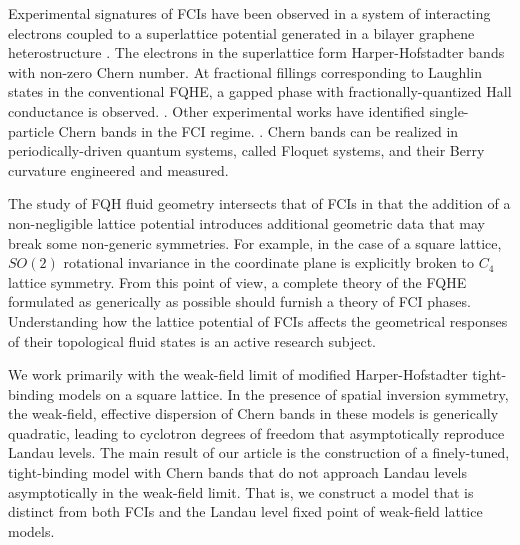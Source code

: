 \documentclass[aps,prb,twocolumn,letterpaper,twoside,nobalancelastpage,groupedaddress,amsmath,amssymb,floatfix,citeautoscript]{revtex4-1}
\begin{document}
 Experimental signatures of FCIs have been observed in a system of interacting electrons coupled to a superlattice potential generated in a bilayer graphene heterostructure \cite{Spantoneaan8458}. The electrons in the superlattice form Harper-Hofstadter bands with non-zero Chern number. At fractional fillings corresponding to Laughlin states in the conventional FQHE, a gapped phase with fractionally-quantized Hall conductance is observed. \cite{Spantoneaan8458}. Other experimental works have identified single-particle Chern bands in the FCI regime. \cite{Jotzu2014,Aidelsburger:2014hm,Aidelsburger:2013ew}. Chern bands can be realized in periodically-driven quantum systems, called Floquet systems, and their Berry curvature engineered and measured.\cite{Flaschner1091}



The study of FQH fluid geometry intersects that of FCIs in that the addition of a non-negligible lattice potential introduces additional geometric data that may break some non-generic symmetries. For example, in the case of a square lattice, $SO(2)$ rotational invariance in the coordinate plane is explicitly broken to $C_4$ lattice symmetry. From this point of view, a complete theory of the FQHE formulated as generically as possible should furnish a theory of FCI phases. Understanding how the lattice potential of FCIs affects the geometrical responses of their topological fluid states is an active research subject. \cite{shapourian_viscoelastic_2015}

We work primarily with the weak-field limit of modified Harper-Hofstadter tight-binding models\cite{harper_general_1955,Azbel:1964tk} on a square lattice. In the presence of spatial inversion symmetry, the weak-field, effective dispersion of Chern bands in these models is generically quadratic, leading to cyclotron degrees of freedom that asymptotically reproduce Landau levels\cite{Harper:2014vi,haldane_geometry_2015}. The main result of our article is the construction of a finely-tuned, tight-binding model with Chern bands that do not approach Landau levels asymptotically in the weak-field limit. That is, we construct a model that is distinct from both FCIs and the Landau level fixed point of weak-field lattice models.
\end{document}
